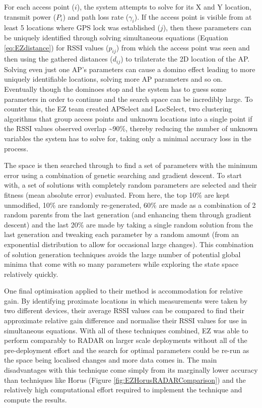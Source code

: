 \documentclass{UoYCSproject}
\begin{document}
                For each access point ($i$), the system attempts to solve for its X and Y location, transmit power ($P_i$) and path loss rate ($\gamma_i$). If the access point is visible from at least 5 locations where GPS lock was established ($j$), then these parameters can be uniquely identified through solving simultaneous equations (Equation \ref{eq:EZdistance}) for RSSI values ($p_{ij}$) from which the access point was seen and then using the gathered distances ($d_{ij}$) to trilaterate the 2D location of the AP. Solving even just one AP's parameters can cause a domino effect leading to more uniquely identifiable locations, solving more AP parameters and so on. Eventually though the dominoes stop and the system has to guess some parameters in order to continue and the search space can be incredibly large. To counter this, the EZ team created APSelect and LocSelect, two clustering algorithms that group access points and unknown locations into a single point if the RSSI values observed overlap \textasciitilde90\%, thereby reducing the number of unknown variables the system has to solve for, taking only a minimal accuracy loss in the process.
                
                The space is then searched through to find a set of parameters with the minimum error using a combination of genetic searching and gradient descent. To start with, a set of solutions with completely random parameters are selected and their fitness (mean absolute error) evaluated. From here, the top 10\% are kept unmodified, 10\% are randomly re-generated, 60\% are made as a combination of 2 random parents from the last generation (and enhancing them through gradient descent) and the last 20\% are made by taking a single random solution from the last generation and tweaking each parameter by a random amount (from an exponential distribution to allow for occasional large changes). This combination of solution generation techniques avoids the large number of potential global minima that come with so many parameters while exploring the state space relatively quickly.
                
                One final optimisation applied to their method is accommodation for relative gain. By identifying proximate locations in which measurements were taken by two different devices, their average RSSI values can be compared to find their approximate relative gain difference and normalise their RSSI values for use in simultaneous equations. With all of these techniques combined, EZ was able to perform comparably to RADAR on larger scale deployments without all of the pre-deployment effort and the search for optimal parameters could be re-run as the space being localised changes and more data comes in. The main disadvantages with this technique come simply from its marginally lower accuracy than techniques like Horus (Figure \ref{fig:EZHorusRADARComparison}) and the relatively high computational effort required to implement the technique and compute the results.
                
\end{document}
